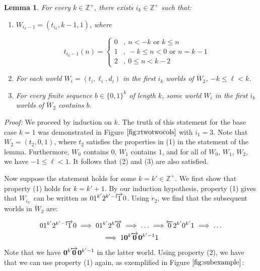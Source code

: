 \documentclass[12pt]{amsart}
\newtheorem{lemma}[theorem]{Lemma}
\newcommand{\laa}[1]{\hspace{-0.11cm}\overleftarrow{#1}}
\newcommand{\raa}[1]{\hspace{-0.11cm}\overrightarrow{#1}}
\newcommand{\rtwo}{\mathring{r}_2}
\newcommand{\wtwo}{\mathring{W}_2}
\newcommand{\zp}{\mathbb{Z}^+}
\begin{document}
\begin{lemma}
For every $k\in \zp$, there exists $i_k\in \zp$ such that:

\begin{enumerate}
\item $W_{i_k - 1}=(t_{i_k}, k - 1, 1)$, where

\begin{displaymath}
t_{i_k - 1}(n) = \left\{
\begin{array}{ll}
0 & ,\ n < -k \text{ or } k \leq n \\
1 & ,\ -k \leq n < 0 \text{ or } n = k - 1 \\
2 & ,\ 0 \leq n < k - 2
\end{array}
\right.
\end{displaymath}

\item For each world $W_i = (t_i, \ell_i, d_i)$ in the first $i_k$ worlds of $\wtwo$, $-k \leq \ell < k$.

\item For every finite sequence $b\in \{0, 1\}^k$ of length $k$, some world $W_i$ in the first $i_k$ worlds of $\wtwo$ contains $b$.
\end{enumerate}
\end{lemma}

\textit{Proof:} We proceed by induction on $k$. The truth of this statement for the base case $k = 1$ was demonstrated in Figure $\ref{fig:rtwotwocols}$ with $i_1=3$. Note that $W_2 = (t_2, 0, 1)$, where $t_2$ satisfies the properties in (1) in the statement of the lemma. Furthermore, $W_0$ contains $0$, $W_1$ contains $1$, and for all of $W_0$, $W_1$, $W_2$, we have $-1\leq \ell < 1$. It follows that (2) and (3) are also satisfied.

Now suppose the statement holds for some $k = k'\in \zp$. We first show that property (1) holds for $k = k' + 1$. By our induction hypothesis, property (1) gives that $W_{i_{k'}}$ can be written as $01^{k'}2^{k'-1}\raa{1}0$. Using $\rtwo$, we find that the subsequent worlds in $\wtwo$ are:

$$01^{k'}2^{k'-1}\raa{1}0 \implies 01^{k'}2^{k'}\raa{0} \implies \ldots \implies \laa{0}2^{k'}0^{k'}1 \implies \ldots$$
$$\implies 1\textbf{0}^{k'}\raa{\textbf{0}}\textbf{0}^{k'-1}1$$

Note that we have $\textbf{0}^{k'}\raa{\textbf{0}}\textbf{0}^{k'-1}$ in the latter world. Using property (2), we have that we can use property (1) again, as exemplified in Figure $\ref{fig:subexample}$:
\end{document}
